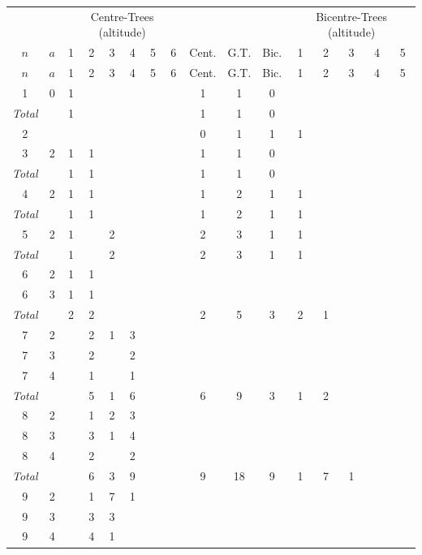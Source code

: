\documentclass[11pt,a4paper]{article}
\begin{document}
{\small
\renewcommand{\arraystretch}{1.1}
\begin{longtable}{c c | c c c c c c | c c c | c c c c c}
\hline
\multicolumn{2}{c|}{} & \multicolumn{6}{c|}{Centre-Trees (altitude)} & \multicolumn{3}{c|}{} & \multicolumn{5}{c}{Bicentre-Trees (altitude)} \\
$n$ & $a$ & 1 & 2 & 3 & 4 & 5 & 6 & Cent. & G.T. & Bic. & 1 & 2 & 3 & 4 & 5 \\
\hline
\endfirsthead
\hline
$n$ & $a$ & 1 & 2 & 3 & 4 & 5 & 6 & Cent. & G.T. & Bic. & 1 & 2 & 3 & 4 & 5 \\
\hline
\endhead
1 & 0 & 1 & & & & & & 1 & 1 & 0 & & & & & \\
\textit{Total} & & 1 & & & & & & 1 & 1 & 0 & & & & & \\
2 &   &   & & & & & & 0 & 1 & 1 & 1 & & & & \\
3 & 2 & 1 & 1 & & & & & 1 & 1 & 0 & & & & & \\
\textit{Total} & & 1 & 1 & & & & & 1 & 1 & 0 & & & & & \\
4 & 2 & 1 & 1 & & & & & 1 & 2 & 1 & 1 & & & & \\
\textit{Total} & & 1 & 1 & & & & & 1 & 2 & 1 & 1 & & & & \\
5 & 2 & 1 & & 2 & & & & 2 & 3 & 1 & 1 & & & & \\
\textit{Total} & & 1 & & 2 & & & & 2 & 3 & 1 & 1 & & & & \\
6 & 2 & 1 & 1 & & & & & & & & & & & & \\
6 & 3 & 1 & 1 & & & & & & & & & & & & \\
\textit{Total} & & 2 & 2 & & & & & 2 & 5 & 3 & 2 & 1 & & & \\
7 & 2 & & 2 & 1 & 3 & & & & & & & & & & \\
7 & 3 & & 2 &   & 2 & & & & & & & & & & \\
7 & 4 & & 1 &   & 1 & & & & & & & & & & \\
\textit{Total} & & & 5 & 1 & 6 & & & 6 & 9 & 3 & 1 & 2 & & & \\
8 & 2 & & 1 & 2 & 3 & & & & & & & & & & \\
8 & 3 & & 3 & 1 & 4 & & & & & & & & & & \\
8 & 4 & & 2 &   & 2 & & & & & & & & & & \\
\textit{Total} & & & 6 & 3 & 9 & & & 9 & 18 & 9 & 1 & 7 & 1 & & \\
9 & 2 & & 1 & 7 & 1 & & & & & & & & & & \\
9 & 3 & & 3 & 3 &   & & & & & & & & & & \\
9 & 4 & & 4 & 1 &   & & & & & & & & & & \\

\end{longtable}}
\end{document}
